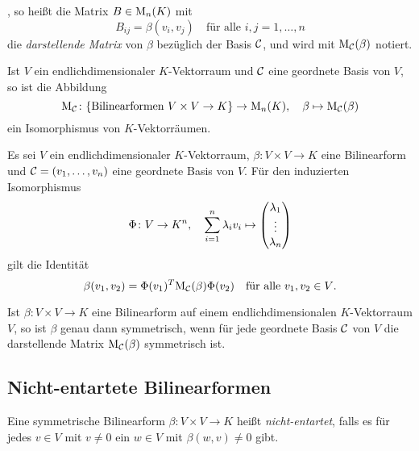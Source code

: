 \begin{definition}
  , so heißt die Matrix $B \in \mathrm{M}_n(K)$ mit
  \[
    B_{ij} = \beta(v_i, v_j)
    \quad
    \text{für alle $i,j = 1, \dotsc, n$}
  \]
  die \emph{darstellende Matrix} von $\beta$ bezüglich der Basis $\mathcal{C}$, und wird mit $\mathrm{M}_{\mathcal{C}}(\beta)$ notiert.
\end{definition}


\begin{lemma}
  Ist $V$ ein endlichdimensionaler $K$-Vektorraum und $\mathcal{C}$ eine geordnete Basis von $V$, so ist die Abbildung
  \[
    \mathrm{M}_{\mathcal{C}}
    \colon
    \{\text{Bilinearformen $V \times V \to K$}\}
    \to
    \mathrm{M}_n(K),
    \quad
    \beta
    \mapsto
    \mathrm{M}_{\mathcal{C}}(\beta)
  \]
  ein Isomorphismus von $K$-Vektorräumen.
\end{lemma}


\begin{lemma}
  Es sei $V$ ein endlichdimensionaler $K$-Vektorraum, $\beta \colon V \times V \to K$ eine Bilinearform und $\mathcal{C} = (v_1, \dotsc, v_n)$ eine geordnete Basis von $V$.
  Für den induzierten Isomorphismus
  \[
    \Phi \colon V \to K^n,
    \quad
    \sum_{i=1}^n \lambda_i v_i \mapsto \begin{pmatrix} \lambda_1 \\ \vdots \\ \lambda_n \end{pmatrix}
  \]
  gilt die Identität
  \[
    \beta(v_1, v_2)
    =
    \Phi(v_1)^T \mathrm{M}_{\mathcal{C}}(\beta) \Phi(v_2)
    \quad
    \text{für alle $v_1, v_2 \in V$}.
  \]
\end{lemma}


\begin{corollary}
  Ist $\beta \colon V \times V \to K$ eine Bilinearform auf einem endlichdimensionalen $K$-Vektorraum $V$, so ist $\beta$ genau dann symmetrisch, wenn für jede geordnete Basis $\mathcal{C}$ von $V$ die darstellende Matrix $\mathrm{M}_{\mathcal{C}}(\beta)$ symmetrisch ist.
\end{corollary}












\subsection{Nicht-entartete Bilinearformen}


\begin{definition}
  Eine symmetrische Bilinearform $\beta \colon V \times V \to K$ heißt \emph{nicht-entartet}, falls es für jedes $v \in V$ mit $v \neq 0$ ein $w \in V$ mit $\beta(w,v) \neq 0$ gibt.
\end{definition}


